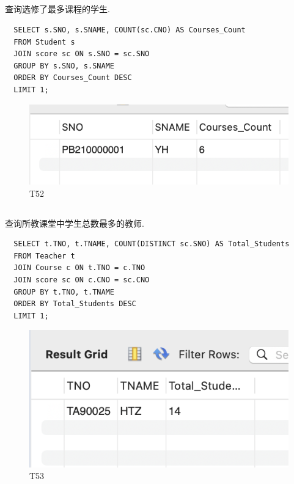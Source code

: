 \documentclass[UTF8]{ctexart}
\begin{document}
\subsection{}
查询选修了最多课程的学生.
\begin{lstlisting}
  SELECT s.SNO, s.SNAME, COUNT(sc.CNO) AS Courses_Count
  FROM Student s
  JOIN score sc ON s.SNO = sc.SNO
  GROUP BY s.SNO, s.SNAME
  ORDER BY Courses_Count DESC
  LIMIT 1;  
\end{lstlisting}
\begin{figure}[H]
  \centering
  \includegraphics[scale=0.7]{pics/52.png}
  \caption*{T52}
\end{figure}

\subsection{}
查询所教课堂中学生总数最多的教师.
\begin{lstlisting}
  SELECT t.TNO, t.TNAME, COUNT(DISTINCT sc.SNO) AS Total_Students
  FROM Teacher t
  JOIN Course c ON t.TNO = c.TNO
  JOIN score sc ON c.CNO = sc.CNO
  GROUP BY t.TNO, t.TNAME
  ORDER BY Total_Students DESC
  LIMIT 1;
\end{lstlisting}
\begin{figure}[H]
  \centering
  \includegraphics[scale=0.7]{pics/53.png}
  \caption*{T53}
\end{figure}


\end{document}
